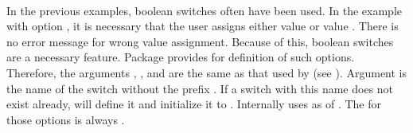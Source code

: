 \begin{Declaration}
                       \\
\end{Declaration}
%
%
In the previous examples, boolean switches often have been used. In the example
with option , it is necessary that the user assigns either
value  or value . There is no error message for
wrong value assignment. Because of this, boolean switches are a necessary
feature. Package  provides  for definition of
such options. Therefore, the arguments , , and
 are the same as that used by  (see
). Argument 
is the name of the switch without the prefix . If a switch with this
name does not exist already,  will define it and
initialize it to . Internally  uses
 as  of . The
 for those options is always .

